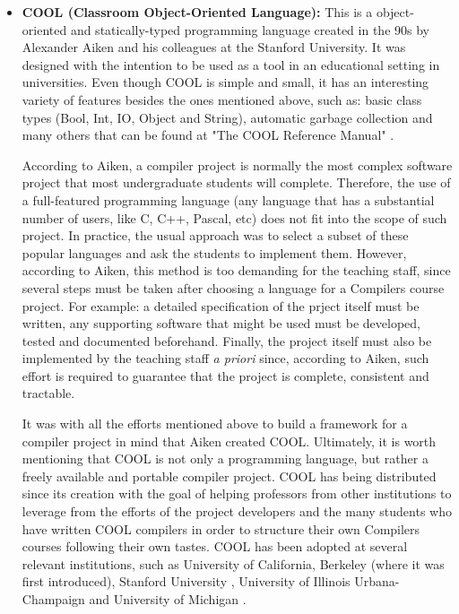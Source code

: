 \begin{itemize}
    \item \textbf{COOL (Classroom Object-Oriented Language):} This is a object-oriented and statically-typed programming language \cite{aiken1996cool} created in the 90s by Alexander Aiken and his colleagues at the Stanford University. It was designed with the intention to be used as a tool in an educational setting in universities. Even though COOL is simple and small, it has an interesting variety of features besides the ones mentioned above, such as: basic class types (Bool, Int, IO, Object and String), automatic garbage collection and many others that can be found at "The COOL Reference Manual" \cite{cool_reference_manual}.
    
    According to Aiken, a compiler project is normally the most complex software project that most undergraduate students will complete. Therefore, the use of a full-featured programming language (any language that has a substantial number of users, like C, C++, Pascal, etc) does not fit into the scope of such project. In practice, the usual approach was to select a subset of these popular languages and ask the students to implement them. However, according to Aiken, this method is too demanding for the teaching staff, since several steps must be taken after choosing a language for a Compilers course project. For example: a detailed specification of the prject itself must be written, any supporting software that might be used must be developed, tested and documented beforehand. Finally, the project itself must also be implemented by the teaching staff \textit{a priori} since, according to Aiken, such effort is required to guarantee that the project is complete, consistent and tractable.
    
    It was with all the efforts mentioned above to build a framework for a compiler project in mind that Aiken created COOL. Ultimately, it is worth mentioning that COOL is not only a programming language, but rather a freely available and portable compiler project. COOL has being distributed since its creation with the goal of helping professors from other institutions to leverage from the efforts of the project developers and the many students who have written COOL compilers in order to structure their own Compilers courses following their own tastes. COOL has been adopted at several relevant institutions, such as University of California, Berkeley \cite{aiken1996cool} (where it was first introduced), Stanford University \cite{stanford_cs143_compilers_course_page}, University of Illinois Urbana-Champaign \cite{university_of_illinois_urbana_champaign_compilers_course_page} and University of Michigan \cite{university_of_michigan_compiler_construction_course_page}.
    

\end{itemize}
